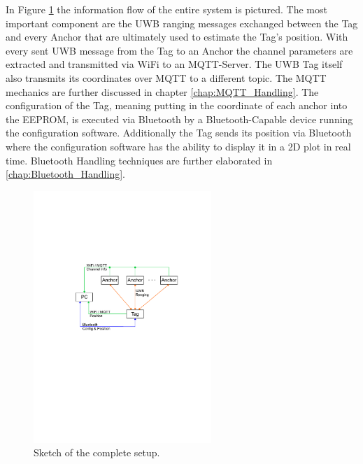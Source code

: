In Figure \ref{fig:information_flow} the information flow of the entire system is pictured. 
The most important component are the UWB ranging messages exchanged between the Tag and every Anchor that are ultimately used to estimate the Tag's position. 
With every sent UWB message from the Tag to an Anchor the channel parameters are extracted and transmitted via WiFi to an MQTT-Server. 
The UWB Tag itself also transmits its coordinates over MQTT to a different topic. 
The MQTT mechanics are further discussed in chapter \ref{chap:MQTT_Handling}. 
\vspace{4pt}
\newline
The configuration of the Tag, meaning putting in the coordinate of each anchor into the EEPROM, is executed via Bluetooth by a Bluetooth-Capable device running the configuration software. 
Additionally the Tag sends its position via Bluetooth where the configuration software has the ability to display it in a 2D plot in real time. 
Bluetooth Handling techniques are further elaborated in \ref{chap:Bluetooth_Handling}. 

\begin{figure}[!hbt]
	\centering
	\includegraphics[width=0.6\textwidth]{pictures/information_flow.pdf}
	\caption{Sketch of the complete setup.}
	\label{fig:information_flow}
\end{figure}
